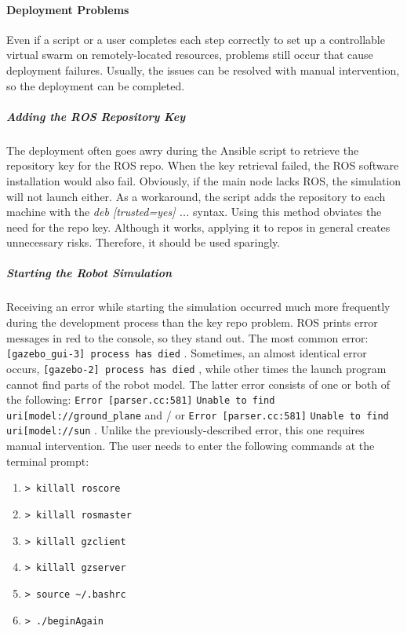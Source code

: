 \documentclass[9pt,twocolumn,twoside]{../../styles/osajnl}
\begin{document}
\paragraph{Deployment Problems}
Even if a script or a user completes each step correctly to set up a controllable virtual swarm on remotely-located resources, problems still occur that cause deployment failures.  Usually, the issues can be resolved with manual intervention, so the deployment can be completed.  

\subparagraph{Adding the ROS Repository Key}
The deployment often goes awry during the Ansible script to retrieve the repository key for the ROS repo.  When the key retrieval failed, the ROS software installation would also fail.  Obviously, if the main node lacks ROS, the simulation will not launch either.  As a workaround, the script adds the repository to each machine with the \textit{deb [trusted=yes] ...} syntax.  Using this method obviates the need for the repo key.  Although it works, applying it to repos in general creates unnecessary risks.  Therefore, it should be used sparingly.  

\subparagraph{Starting the Robot Simulation}
Receiving an error while starting the simulation occurred much more frequently during the development process than the key repo problem.  ROS prints error messages in red to the console, so they stand out.  The most common error: {\color{red} \lstinline[style=BashInputStyle]![gazebo_gui-3] process has died! }.  Sometimes, an almost identical error occurs, {\color{red} \lstinline[style=BashInputStyle]![gazebo-2] process has died! }, while other times the launch program cannot find parts of the robot model.  The latter error consists of one or both of the following: {\color{red} \lstinline[style=BashInputStyle]!Error [parser.cc:581]! }{\lstinline[style=BashInputStyle]!Unable to find uri[model://ground_plane! } and / or {\color{red} \lstinline[style=BashInputStyle]!Error [parser.cc:581]! }{\lstinline[style=BashInputStyle]!Unable to find uri[model://sun! }.  Unlike the previously-described error, this one requires manual intervention.  The user needs to enter the following commands at the terminal prompt: 

\begin{enumerate}
\setlength\itemsep{-6pt}
\item {\lstinline[style=BashInputStyle]!> killall roscore! }
\item {\lstinline[style=BashInputStyle]!> killall rosmaster! }
\item {\lstinline[style=BashInputStyle]!> killall gzclient! } 
\item {\lstinline[style=BashInputStyle]!> killall gzserver! }
\item {\lstinline[style=BashInputStyle]!> source ~/.bashrc! } 
\item {\lstinline[style=BashInputStyle]!> ./beginAgain! }
\end{enumerate}
\end{document}

